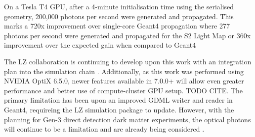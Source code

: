 \par
On a Tesla T4 GPU, after a 4-minute initialisation time using the serialised geometry, 200,000 photons per second were generated and propagated.
This marks a 720x improvement over single-core Geant4 propagation where 277 photons per second were generated and propagated for the S2 Light Map or 360x improvement over the expected gain when compared to Geant4

\par
The LZ collaboration is continuing to develop upon this work with an integration plan into the simulation chain \cite{SEriksen_Opticks_CHEP_2021_ref}.
Additionally, as this work was performed using NVIDIA OptiX 6.5.0, newer features available in 7.0.0+ will allow even greater performance and better use of compute-cluster GPU setup.
TODO CITE.
The primary limitation has been upon an improved GDML writer and reader in Geant4, requireing the LZ simulation package to update. 
However, with the planning for Gen-3 direct detection dark matter experiments, the optical photons will continue to be a limitation and are already being considered \cite{DARWIN_GPU_simulations_2022}.
